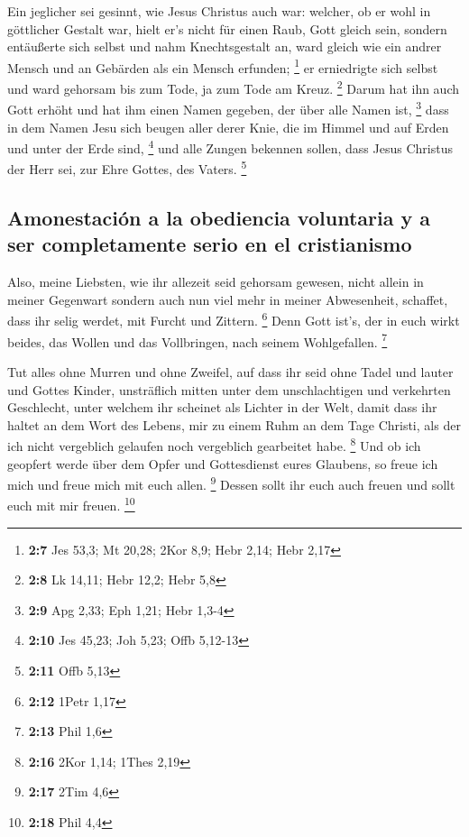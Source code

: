  Ein jeglicher sei gesinnt, wie Jesus Christus auch war:
 welcher, ob er wohl in göttlicher Gestalt war, hielt er's
nicht für einen Raub, Gott gleich sein,  sondern
entäußerte sich selbst und nahm Knechtsgestalt an, ward gleich wie ein
andrer Mensch und an Gebärden als ein Mensch erfunden; \footnote{\textbf{2:7}
  Jes 53,3; Mt 20,28; 2Kor 8,9; Hebr 2,14; Hebr 2,17}  er
erniedrigte sich selbst und ward gehorsam bis zum Tode, ja zum Tode am
Kreuz. \footnote{\textbf{2:8} Lk 14,11; Hebr 12,2; Hebr 5,8}
 Darum hat ihn auch Gott erhöht und hat ihm einen Namen
gegeben, der über alle Namen ist, \footnote{\textbf{2:9} Apg 2,33; Eph
  1,21; Hebr 1,3-4}  dass in dem Namen Jesu sich beugen
aller derer Knie, die im Himmel und auf Erden und unter der Erde sind,
\footnote{\textbf{2:10} Jes 45,23; Joh 5,23; Offb 5,12-13}
 und alle Zungen bekennen sollen, dass Jesus Christus der
Herr sei, zur Ehre Gottes, des Vaters. \footnote{\textbf{2:11} Offb 5,13}

\hypertarget{amonestaciuxf3n-a-la-obediencia-voluntaria-y-a-ser-completamente-serio-en-el-cristianismo}{%
\subsection{Amonestación a la obediencia voluntaria y a ser
completamente serio en el
cristianismo}\label{amonestaciuxf3n-a-la-obediencia-voluntaria-y-a-ser-completamente-serio-en-el-cristianismo}}

 Also, meine Liebsten, wie ihr allezeit seid gehorsam
gewesen, nicht allein in meiner Gegenwart sondern auch nun viel mehr in
meiner Abwesenheit, schaffet, dass ihr selig werdet, mit Furcht und
Zittern. \footnote{\textbf{2:12} 1Petr 1,17}  Denn Gott
ist's, der in euch wirkt beides, das Wollen und das Vollbringen, nach
seinem Wohlgefallen. \footnote{\textbf{2:13} Phil 1,6}

 Tut alles ohne Murren und ohne Zweifel, 
auf dass ihr seid ohne Tadel und lauter und Gottes Kinder, unsträflich
mitten unter dem unschlachtigen und verkehrten Geschlecht, unter welchem
ihr scheinet als Lichter in der Welt,  damit dass ihr
haltet an dem Wort des Lebens, mir zu einem Ruhm an dem Tage Christi,
als der ich nicht vergeblich gelaufen noch vergeblich gearbeitet habe.
\footnote{\textbf{2:16} 2Kor 1,14; 1Thes 2,19}  Und ob
ich geopfert werde über dem Opfer und Gottesdienst eures Glaubens, so
freue ich mich und freue mich mit euch allen. \footnote{\textbf{2:17}
  2Tim 4,6}  Dessen sollt ihr euch auch freuen und sollt
euch mit mir freuen. \footnote{\textbf{2:18} Phil 4,4}


